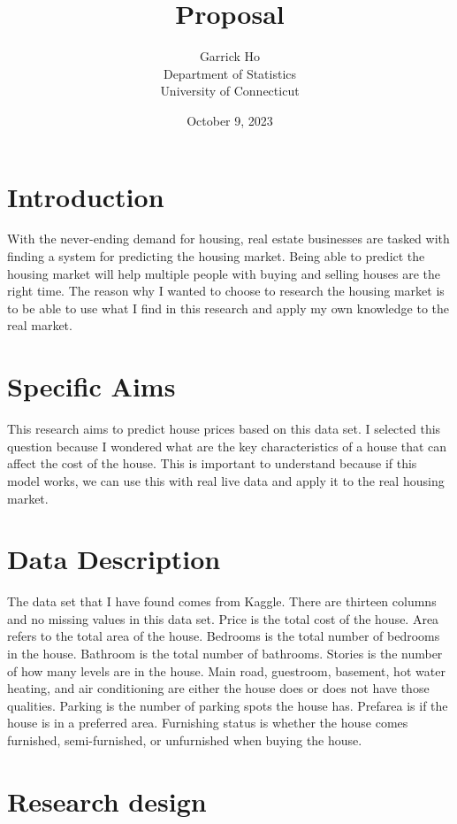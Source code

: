 \documentclass{article}
\title{Proposal}
\author{Garrick Ho \\
Department of Statistics \\
University of Connecticut}
\date{October 9, 2023}
\begin{document}
\maketitle

\section{Introduction}

With the never-ending demand for housing, real estate businesses are tasked with finding a system for predicting the housing market. Being able to predict the housing market will help multiple people with buying and selling houses are the right time. The reason why I wanted to choose to research the housing market is to be able to use what I find in this research and apply my own knowledge to the real market. 

\section{Specific Aims}

This research aims to predict house prices based on this data set. I selected this question because I wondered what are the key characteristics of a house that can affect the cost of the house. This is important to understand because if this model works, we can use this with real live data and apply it to the real housing market. 

\section{Data Description}

The data set that I have found comes from Kaggle. There are thirteen columns and no missing values in this data set. Price is the total cost of the house. Area refers to the total area of the house. Bedrooms is the total number of bedrooms in the house. Bathroom is the total number of bathrooms. Stories is the number of how many levels are in the house. Main road, guestroom, basement, hot water heating, and air conditioning are either the house does or does not have those qualities. Parking is the number of parking spots the house has. Prefarea is if the house is in a preferred area. Furnishing status is whether the house comes furnished, semi-furnished, or unfurnished when buying the house. 

\section{Research design}
\end{document}
